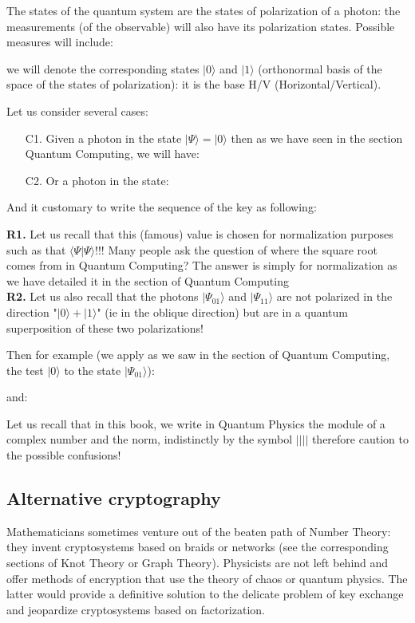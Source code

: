 	The states of the quantum system are the states of polarization of a photon: the measurements (of the observable) will also have its polarization states. Possible measures will include:
	
	we will denote the corresponding states $|0\rangle$ and $|1\rangle$ (orthonormal basis of the space of the states of polarization): it is the base H/V (Horizontal/Vertical).

	Let us consider several cases:
	\begin{enumerate}
		\item[C1.] Given a photon in the state $|\Psi\rangle=|0\rangle$ then as we have seen in the section Quantum Computing, we will have:
		

		\item[C2.] Or a photon in the state:
		
	\end{enumerate}
	And it customary to write the sequence of the key as following:
	
	\begin{tcolorbox}[title=Remarks,colframe=black,arc=10pt]
	\textbf{R1.} Let us recall that this (famous) value is chosen for normalization purposes such as that $\langle \Psi|\Psi\rangle$!!! Many people ask the question of where the square root comes from in Quantum Computing? The answer is simply for normalization as we have detailed it in the section of Quantum Computing\\

	\textbf{R2.} Let us also recall that the photons $|\Psi_{01}\rangle$ and $|\Psi_{11}\rangle$ are not polarized in the direction "$|0\rangle+|1\rangle$" (ie in the oblique direction) but are in a quantum superposition of these two polarizations!
	\end{tcolorbox}
	Then for example (we apply as we saw in the section of Quantum Computing, the test $|0\rangle$ to the state $|\Psi_{01}\rangle$):
	
	and:
	
	\begin{tcolorbox}[title=Remark,colframe=black,arc=10pt]
	Let us recall that in this book, we write in Quantum Physics the module of a complex number and the norm, indistinctly by the symbol $||{}||$ therefore caution to the possible confusions!
	\end{tcolorbox}
	
	\subsection{Alternative cryptography}
	Mathematicians sometimes venture out of the beaten path of Number Theory: they invent cryptosystems based on braids or networks (see the corresponding sections of Knot Theory or Graph Theory). Physicists are not left behind and offer methods of encryption that use the theory of chaos or quantum physics. The latter would provide a definitive solution to the delicate problem of key exchange and jeopardize cryptosystems based on factorization.

